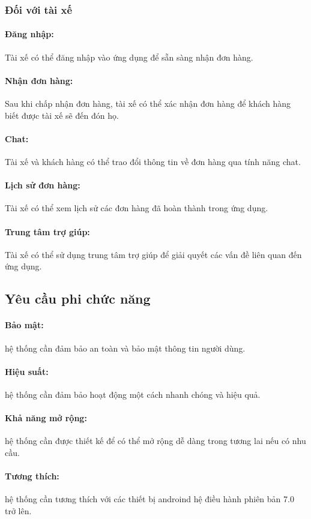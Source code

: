 \documentclass[a4paper,13pt]{report}
\numberwithin{figure}{chapter}
\numberwithin{figure}{section}
\begin{document}
\subsubsection{Đối với tài xế}
\paragraph{Đăng nhập:}  Tài xế có thể đăng nhập vào ứng dụng để sẵn sàng nhận  đơn hàng.
\paragraph{Nhận đơn hàng:}	 Sau khi chấp nhận  đơn hàng, tài xế có thể xác nhận  đơn hàng để khách hàng biết được tài xế sẽ đến đón họ.
\paragraph{Chat:}	 Tài xế và khách hàng có thể trao đổi thông tin về  đơn hàng qua tính năng chat. 
\paragraph{Lịch sử đơn hàng:}	 Tài xế có thể xem lịch sử các  đơn hàng đã hoàn thành trong ứng dụng.
\paragraph{Trung tâm trợ giúp:}	 Tài xế có thể sử dụng trung tâm trợ giúp để giải quyết các vấn đề liên quan đến ứng dụng.

\subsection{Yêu cầu phi chức năng}
\paragraph{Bảo mật:}  hệ thống cần đảm bảo an toàn và bảo mật thông tin người dùng. 
\paragraph{Hiệu suất:}	 hệ thống cần đảm bảo hoạt động một cách nhanh chóng và hiệu quả.
\paragraph{Khả năng mở rộng:}	 hệ thống cần được thiết kế để có thể mở rộng dễ dàng trong tương lai nếu có nhu cầu. 
\paragraph{Tương thích:}	 hệ thống cần tương thích với các thiết bị androind hệ điều hành phiên bản 7.0 trở lên. 
\end{document}
